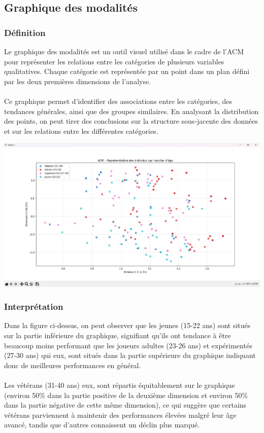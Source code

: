\documentclass[12pt]{scrartcl}
\begin{document}
        \subsection{Graphique des modalités}
            
            \subsubsection{Définition}
                Le graphique des modalités est un outil visuel utilisé dans le cadre de l'ACM pour représenter les relations entre les catégories de plusieurs variables qualitatives. Chaque catégorie est représentée par un point dans un plan défini par les deux premières dimensions de l'analyse.\\\\
                Ce graphique permet d'identifier des associations entre les catégories, des tendances générales, ainsi que des groupes similaires. En analysant la distribution des points, on peut tirer des conclusions sur la structure sous-jacente des données et sur les relations entre les différentes catégories.\\

                \begin{center}
                    \includegraphics[width=1\textwidth]{images/graphique_ACM_ages.png}
                \end{center}

        \subsubsection{Interprétation}
                Dans la figure ci-dessus, on peut observer que les jeunes (15-22 ans) sont situés sur la partie inférieure du graphique, signifiant qu'ils ont tendance à être beaucoup moins performant que les joueurs adultes (23-26 ans) et expérimentés (27-30 ans) qui eux, sont situés dans la partie supérieure du graphique indiquant donc de meilleures performances en général.\\\\
                Les vétérans (31-40 ans) eux, sont répartis équitablement sur le graphique (environ 50\% dans la partie positive de la deuxième dimension et environ 50\% dans la partie négative de cette même dimension), ce qui suggère que certains vétérans parviennent à maintenir des performances élevées malgré leur âge avancé, tandis que d'autres connaissent un déclin plus marqué.\\
\end{document}
